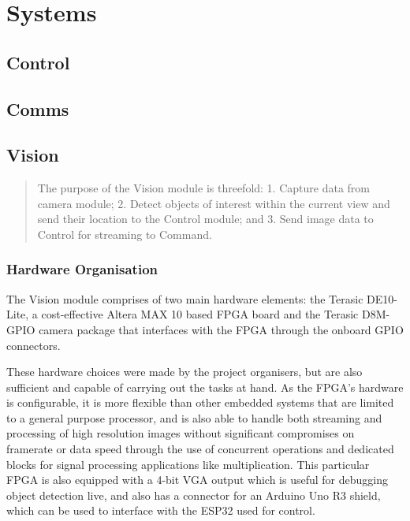 \documentclass[a4paper]{article}
\begin{document}
\section{Systems}

\subsection{Control}
\subsection{Comms}

\subsection{Vision}
\begin{abstract}
    The purpose of the Vision module is threefold:
    1. Capture data from camera module;
    2. Detect objects of interest within the current view and send their location to the Control module; and
    3. Send image data to Control for streaming to Command. 
\end{abstract}

\subsubsection{Hardware Organisation}

The Vision module comprises of two main hardware elements: 
    the Terasic DE10-Lite, a cost-effective Altera MAX 10 based FPGA board \cite{TerasicDE10Web} 
    and the Terasic D8M-GPIO camera package \cite{TerasicD8MWeb}
that interfaces with the FPGA through the onboard GPIO connectors. 

These hardware choices were made by the project organisers, 
but are also sufficient and capable of carrying out the tasks at hand. 
As the FPGA's hardware is configurable, 
it is more flexible than other embedded systems that are limited to a general purpose processor,
and is also able to handle both streaming and processing of high resolution images
without significant compromises on framerate or data speed 
through the use of concurrent operations and dedicated blocks for signal processing applications like multiplication.
This particular FPGA is also equipped with a 4-bit VGA output which is useful for debugging object detection live, 
and also has a connector for an Arduino Uno R3 shield, \cite{TerasicDE10Web} 
which can be used to interface with the ESP32 used for control.  
\end{document}
